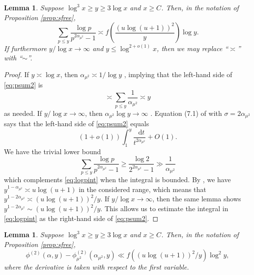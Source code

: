 \documentclass{amsart}
\theoremstyle{plain}
\newtheorem{lem}[thm]{Lemma}
\theoremstyle{remark}
\newcommand*\diff{\mathop{}\!\mathrm{d}}
\begin{document}
\begin{lem}\label{lem:psum2}
	Suppose $\log^3 x \ge y \ge 3\log x$ and $x \ge C$. Then, in the notation of Proposition \ref{prop:sfree},
	\begin{equation}\label{eq:psum2}
		\sum_{p \le y} \frac{\log p}{p^{2\alpha_{\mu^2}}-1} \asymp f\left( \frac{ (u\log (u+1))^2}{y}\right)\log y. 
	\end{equation}
	If furthermore $y/\log x \to \infty$ and $y\le \log^{2+o(1)}x$, then we may replace  ``$\asymp$''  with ``$\sim$''.
\end{lem}
\begin{proof}
	If $y \asymp \log x$, then $\alpha_{\mu^2} \asymp 1/\log y$ \cite[Lem.~2.8]{TenenbaumSfree}, implying that the left-hand side of \eqref{eq:psum2} is 
	\[  \asymp \sum_{p \le y} \frac{1}{\alpha_{\mu^2}} \asymp y\]
	as needed. If $y/\log x \to \infty$, then $\alpha_{\mu^2}\log y \to \infty$ \cite[Lem.~2.8]{TenenbaumSfree}. Equation (7.1) of \cite{HildebrandTenenbaum1986} with $\sigma=2\alpha_{\mu^2}$ says that the left-hand side of \eqref{eq:psum2} equals
	\begin{equation}\label{eq:logpint}
		(1+o(1))\int_{1}^{y} \frac{\diff{t}}{t^{2\alpha_{\mu^2}}}+ O(1).
	\end{equation}
	We have the trivial lower bound 
	\[		\sum_{p \le y} \frac{\log p}{p^{2\alpha_{\mu^2}}-1} \ge \frac{\log 2}{2^{2\alpha_{\mu^2}}-1} \gg \frac{1}{\alpha_{\mu^2}} \]
	which complements \eqref{eq:logpint} when the integral is bounded.
	By \cite[Lem.~2.8]{TenenbaumSfree}, we have $y^{1-\alpha_{\mu^2}}\asymp u\log(u+1)$ in the considered range, which means that $y^{1-2\alpha_{\mu^2}} \asymp (u\log (u+1))^2/y$. If $y/\log x \to \infty$, then the same lemma shows $y^{1-2\alpha_{\mu^2}} \sim (u\log (u+1))^2/y$. This allows us to estimate the integral in \eqref{eq:logpint} as the right-hand side of \eqref{eq:psum2}. 
\end{proof}
\begin{lem}\label{lem:phidiff}
	Suppose $\log^3 x \ge y \ge 3\log x$ and $x \ge C$. Then, in the notation of Proposition \ref{prop:sfree}, \[\phi^{(2)}(\alpha,y)-\phi^{(2)}_{\mu^2}(\alpha_{\mu^2},y) \ll  f((u \log(u+1))^2/y) \log ^2 y,\]
	where the derivative is taken with respect to the first variable.
\end{lem}
\end{document}
